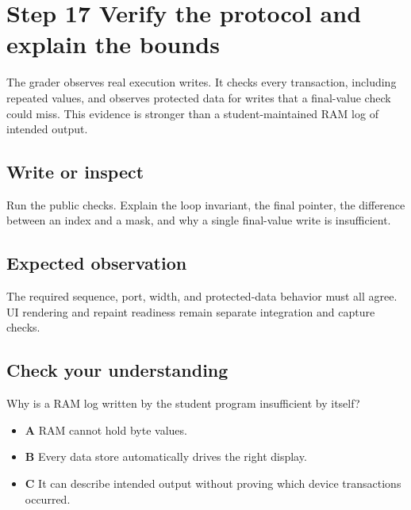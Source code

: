 \section{Step 17 Verify the protocol and explain the
  bounds}\label{005-seven-segment-counter-s17-step-17-verify-the-protocol-and-explain-the-bounds}

The grader observes real execution writes. It checks every transaction,
including repeated values, and observes protected data for writes that a
final-value check could miss. This evidence is stronger than a
student-maintained RAM log of intended output.

\subsection{Write or
  inspect}\label{005-seven-segment-counter-s17-write-or-inspect}

Run the public checks. Explain the loop invariant, the final pointer,
the difference between an index and a mask, and why a single final-value
write is insufficient.

\subsection{Expected
  observation}\label{005-seven-segment-counter-s17-expected-observation}

The required sequence, port, width, and protected-data behavior must all
agree. UI rendering and repaint readiness remain separate integration
and capture checks.

\subsection{Check your
  understanding}\label{005-seven-segment-counter-s17-check-your-understanding}

Why is a RAM log written by the student program insufficient by itself?

\begin{itemize}
  \tightlist
  \item
        \textbf{A} RAM cannot hold byte values.
  \item
        \textbf{B} Every data store automatically drives the right display.
  \item
        \textbf{C} It can describe intended output without proving which
        device transactions occurred.
\end{itemize}

